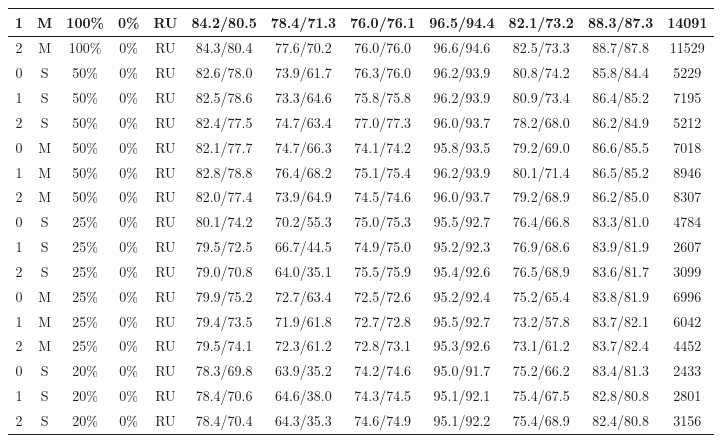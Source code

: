 \begin{table*}
{\begin{tabular}{|c|c|c|c|c||c|c|c|c|c|c||c|}
1 & M & 100\% & 0\% & RU & 84.2/80.5 & 78.4/71.3 & 76.0/76.1 & 96.5/94.4 & 82.1/73.2 & 88.3/87.3 & 14091 \\ \hline
2 & M & 100\% & 0\% & RU & 84.3/80.4 & 77.6/70.2 & 76.0/76.0 & 96.6/94.6 & 82.5/73.3 & 88.7/87.8 & 11529 \\ \hline
0 & S & 50\% & 0\% & RU & 82.6/78.0 & 73.9/61.7 & 76.3/76.0 & 96.2/93.9 & 80.8/74.2 & 85.8/84.4 & 5229 \\ \hline
1 & S & 50\% & 0\% & RU & 82.5/78.6 & 73.3/64.6 & 75.8/75.8 & 96.2/93.9 & 80.9/73.4 & 86.4/85.2 & 7195 \\ \hline
2 & S & 50\% & 0\% & RU & 82.4/77.5 & 74.7/63.4 & 77.0/77.3 & 96.0/93.7 & 78.2/68.0 & 86.2/84.9 & 5212 \\ \hline
0 & M & 50\% & 0\% & RU & 82.1/77.7 & 74.7/66.3 & 74.1/74.2 & 95.8/93.5 & 79.2/69.0 & 86.6/85.5 & 7018 \\ \hline
1 & M & 50\% & 0\% & RU & 82.8/78.8 & 76.4/68.2 & 75.1/75.4 & 96.2/93.9 & 80.1/71.4 & 86.5/85.2 & 8946 \\ \hline
2 & M & 50\% & 0\% & RU & 82.0/77.4 & 73.9/64.9 & 74.5/74.6 & 96.0/93.7 & 79.2/68.9 & 86.2/85.0 & 8307 \\ \hline
0 & S & 25\% & 0\% & RU & 80.1/74.2 & 70.2/55.3 & 75.0/75.3 & 95.5/92.7 & 76.4/66.8 & 83.3/81.0 & 4784 \\ \hline
1 & S & 25\% & 0\% & RU & 79.5/72.5 & 66.7/44.5 & 74.9/75.0 & 95.2/92.3 & 76.9/68.6 & 83.9/81.9 & 2607 \\ \hline
2 & S & 25\% & 0\% & RU & 79.0/70.8 & 64.0/35.1 & 75.5/75.9 & 95.4/92.6 & 76.5/68.9 & 83.6/81.7 & 3099 \\ \hline
0 & M & 25\% & 0\% & RU & 79.9/75.2 & 72.7/63.4 & 72.5/72.6 & 95.2/92.4 & 75.2/65.4 & 83.8/81.9 & 6996 \\ \hline
1 & M & 25\% & 0\% & RU & 79.4/73.5 & 71.9/61.8 & 72.7/72.8 & 95.5/92.7 & 73.2/57.8 & 83.7/82.1 & 6042 \\ \hline
2 & M & 25\% & 0\% & RU & 79.5/74.1 & 72.3/61.2 & 72.8/73.1 & 95.3/92.6 & 73.1/61.2 & 83.7/82.4 & 4452 \\ \hline
0 & S & 20\% & 0\% & RU & 78.3/69.8 & 63.9/35.2 & 74.2/74.6 & 95.0/91.7 & 75.2/66.2 & 83.4/81.3 & 2433 \\ \hline
1 & S & 20\% & 0\% & RU & 78.4/70.6 & 64.6/38.0 & 74.3/74.5 & 95.1/92.1 & 75.4/67.5 & 82.8/80.8 & 2801 \\ \hline
2 & S & 20\% & 0\% & RU & 78.4/70.4 & 64.3/35.3 & 74.6/74.9 & 95.1/92.2 & 75.4/68.9 & 82.4/80.8 & 3156 \\ \hline

\end{tabular}}
\end{table*}
